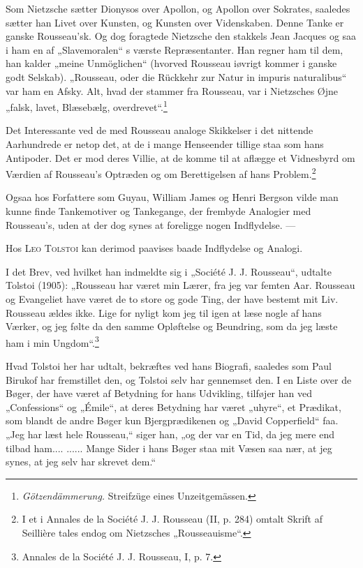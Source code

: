 \documentclass[12pt,a4paper,openany]{book}
\newcommand{\opage}[1]{\marginnote{\footnotesize\textit{[#1]}}}
\begin{document}
Som Nietzsche sætter Dionysos over Apollon, og Apollon
over Sokrates, saaledes sætter han Livet over Kunsten, og Kunsten
over Videnskaben. Denne Tanke er ganske Rousseau’sk.
Og dog foragtede Nietzsche den stakkels Jean Jacques og saa i
ham en af „Slavemoralen“ s værste Repræsentanter. Han regner
ham til dem, han kalder „meine Unmöglichen“ (hvorved Rousseau
iøvrigt kommer i ganske godt Selskab). „Rousseau, oder die
\setcounter{footnote}{0}%
\opage{128}Rückkehr zur Natur in impuris naturalibus“ var ham en Afsky.
Alt, hvad der stammer fra Rousseau, var i Nietzsches Øjne
„falsk, lavet, Blæsebælg, overdrevet“.\footnote[1]{\textit{Götzendämmerung.} Streifzüge eines Unzeitgemässen.}

Det Interessante ved de med Rousseau analoge Skikkelser
i det nittende Aarhundrede er netop det, at de i mange Henseender
tillige staa som hans Antipoder. Det er mod deres
Villie, at de komme til at aflægge et Vidnesbyrd om Værdien
af Rousseau’s Optræden og om Berettigelsen af hans Problem.\footnote[2]{I et i Annales de la Société J. J. Rousseau (II, p. 284) omtalt Skrift af Seillière tales endog om Nietzsches „Rousseauisme“.}

Ogsaa hos Forfattere som Guyau, William James og Henri
Bergson vilde man kunne finde Tankemotiver og Tankegange,
der frembyde Analogier med Rousseau’s, uden at der dog synes
at foreligge nogen Indflydelse. ---

Hos \textsc{Leo Tolstoi} kan derimod paavises baade Indflydelse
og Analogi.

I det Brev, ved hvilket han indmeldte sig i „Société J. J.
Rousseau“, udtalte Tolstoi (1905): „Rousseau har været min
Lærer, fra jeg var femten Aar. Rousseau og Evangeliet have været
de to store og gode Ting, der have bestemt mit Liv. Rousseau
ældes ikke. Lige for nyligt kom jeg til igen at læse nogle af
hans Værker, og jeg følte da den samme Opløftelse og Beundring,
som da jeg læste ham i min Ungdom“.\footnote[3]{Annales de la Société J. J. Rousseau, I, p. 7.}

Hvad Tolstoi her har udtalt, bekræftes ved hans Biografi,
saaledes som Paul Birukof har fremstillet den, og Tolstoi selv
har gennemset den. I en Liste over de Bøger, der have været
af Betydning for hans Udvikling, tilføjer han ved „Confessions“
og „Émile“, at deres Betydning har været „uhyre“, et Prædikat,
som blandt de andre Bøger kun Bjergprædikenen og „David
Copperfield“ faa. „Jeg har læst hele Rousseau,“ siger han,
„og der var en Tid, da jeg mere end tilbad ham.... ...... Mange
Sider i hans Bøger staa mit Væsen saa nær, at jeg synes, at
jeg selv har skrevet dem.“
\end{document}
